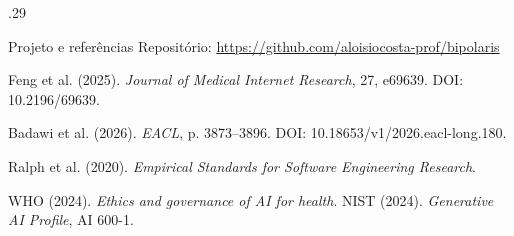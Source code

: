 \documentclass[final]{beamer}
\begin{document}
\begin{frame}[t]
\begin{columns}[t,totalwidth=\linewidth]
\begin{column}{.29\linewidth}
\begin{block}{Projeto e referências}
Repositório: \url{https://github.com/aloisiocosta-prof/bipolaris}

\vspace{0.4em}
\scriptsize
Feng et al. (2025). \textit{Journal of Medical Internet Research}, 27, e69639. DOI: 10.2196/69639.\par
Badawi et al. (2026). \textit{EACL}, p. 3873--3896. DOI: 10.18653/v1/2026.eacl-long.180.\par
Ralph et al. (2020). \textit{Empirical Standards for Software Engineering Research}.\par
WHO (2024). \textit{Ethics and governance of AI for health}. NIST (2024). \textit{Generative AI Profile}, AI 600-1.
\end{block}
\end{column}
\end{columns}
\end{frame}
\end{document}
